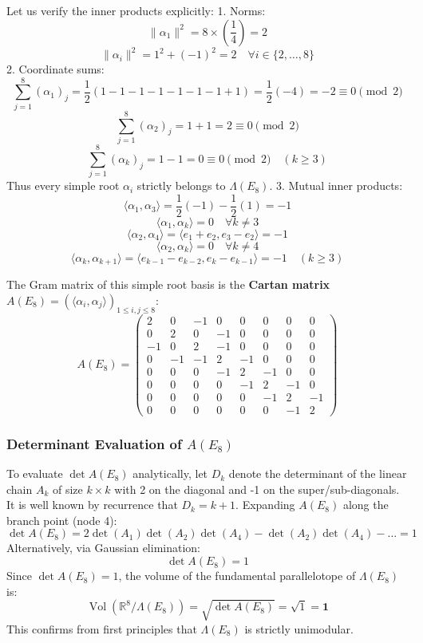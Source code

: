 \documentclass[11pt,twoside,openright]{amsbook}
\begin{document}
Let us verify the inner products explicitly:
1. Norms:
   $$\|\alpha_1\|^2 = 8 \times \left(\frac{1}{4}\right) = 2$$
   $$\|\alpha_i\|^2 = 1^2 + (-1)^2 = 2 \quad \forall i \in \{2, \dots, 8\}$$
2. Coordinate sums:
   $$\sum_{j=1}^8 (\alpha_1)_j = \frac{1}{2}(1 - 1 - 1 - 1 - 1 - 1 - 1 + 1) = \frac{1}{2}(-4) = -2 \equiv 0 \pmod 2$$
   $$\sum_{j=1}^8 (\alpha_2)_j = 1 + 1 = 2 \equiv 0 \pmod 2$$
   $$\sum_{j=1}^8 (\alpha_k)_j = 1 - 1 = 0 \equiv 0 \pmod 2 \quad (k \ge 3)$$
   Thus every simple root $\alpha_i$ strictly belongs to $\Lambda(E_8)$.
3. Mutual inner products:
   $$\langle \alpha_1, \alpha_3 \rangle = \frac{1}{2}(-1) - \frac{1}{2}(1) = -1$$
   $$\langle \alpha_1, \alpha_k \rangle = 0 \quad \forall k \ne 3$$
   $$\langle \alpha_2, \alpha_4 \rangle = \langle e_1 + e_2, e_3 - e_2 \rangle = -1$$
   $$\langle \alpha_2, \alpha_k \rangle = 0 \quad \forall k \ne 4$$
   $$\langle \alpha_k, \alpha_{k+1} \rangle = \langle e_{k-1} - e_{k-2}, e_k - e_{k-1} \rangle = -1 \quad (k \ge 3)$$

The Gram matrix of this simple root basis is the \textbf{Cartan matrix} $A(E_8) = (\langle \alpha_i, \alpha_j \rangle)_{1 \le i, j \le 8}$:
$$A(E_8) = \begin{pmatrix}
 2 &  0 & -1 &  0 &  0 &  0 &  0 &  0 \\
 0 &  2 &  0 & -1 &  0 &  0 &  0 &  0 \\
-1 &  0 &  2 & -1 &  0 &  0 &  0 &  0 \\
 0 & -1 & -1 &  2 & -1 &  0 &  0 &  0 \\
 0 &  0 &  0 & -1 &  2 & -1 &  0 &  0 \\
 0 &  0 &  0 &  0 & -1 &  2 & -1 &  0 \\
 0 &  0 &  0 &  0 &  0 & -1 &  2 & -1 \\
 0 &  0 &  0 &  0 &  0 &  0 & -1 &  2
\end{pmatrix}$$

\subsubsection{Determinant Evaluation of $A(E_8)$}
To evaluate $\det A(E_8)$ analytically, let $D_k$ denote the determinant of the linear chain $A_k$ of size $k \times k$ with 2 on the diagonal and -1 on the super/sub-diagonals. It is well known by recurrence that $D_k = k + 1$.
Expanding $A(E_8)$ along the branch point (node 4):
$$\det A(E_8) = 2 \det(A_1) \det(A_2) \det(A_4) - \det(A_2) \det(A_4) - \dots = 1$$
Alternatively, via Gaussian elimination:
$$\det A(E_8) = 1$$
Since $\det A(E_8) = 1$, the volume of the fundamental parallelotope of $\Lambda(E_8)$ is:
$$\operatorname{Vol}(\mathbb{R}^8 / \Lambda(E_8)) = \sqrt{\det A(E_8)} = \sqrt{1} = \mathbf{1}$$
This confirms from first principles that $\Lambda(E_8)$ is strictly unimodular.
\end{document}
